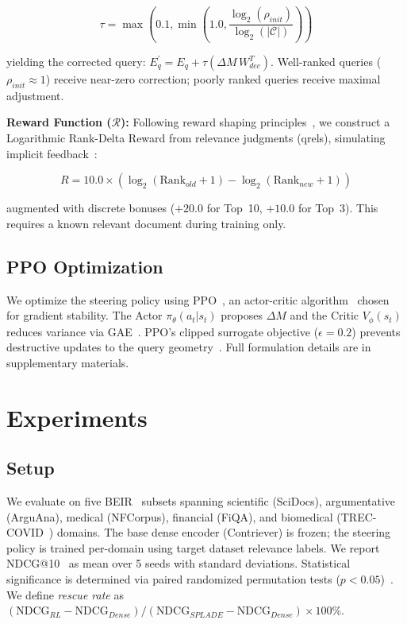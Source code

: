 \documentclass[sigconf]{acmart}
\begin{document}
\begin{equation}
\tau = \max\!\left(0.1, \min\!\left(1.0, \frac{\log_2(\rho_{init})}{\log_2(|\mathcal{C}|)}\right)\right)
\end{equation}

yielding the corrected query: $E_q^{\prime} = E_q + \tau (\Delta M \, W_{dec}^T)$. Well-ranked queries ($\rho_{init} \approx 1$) receive near-zero correction; poorly ranked queries receive maximal adjustment.

\textbf{Reward Function ($\mathcal{R}$):} Following reward shaping principles~\cite{ng1999}, we construct a Logarithmic Rank-Delta Reward from relevance judgments (qrels), simulating implicit feedback~\cite{joachims2002}:

\begin{equation}
R = 10.0 \times (\log_2(\text{Rank}_{old} + 1) - \log_2(\text{Rank}_{new} + 1))
\end{equation}

augmented with discrete bonuses ($+20.0$ for Top~10, $+10.0$ for Top~3). This requires a known relevant document during training only.

\subsection{PPO Optimization}

We optimize the steering policy using PPO~\cite{schulman2017}, an actor-critic algorithm~\cite{konda1999} chosen for gradient stability. The Actor $\pi_\theta(a_t|s_t)$ proposes $\Delta M$ and the Critic $V_\phi(s_t)$ reduces variance via GAE~\cite{schulman2016}. PPO's clipped surrogate objective ($\epsilon = 0.2$) prevents destructive updates to the query geometry~\cite{engstrom2020}. Full formulation details are in supplementary materials.

\section{Experiments}

\subsection{Setup}

We evaluate on five BEIR~\cite{thakur2021} subsets spanning scientific (SciDocs), argumentative (ArguAna), medical (NFCorpus), financial (FiQA), and biomedical (TREC-COVID~\cite{voorhees2021}) domains. The base dense encoder (Contriever) is frozen; the steering policy is trained per-domain using target dataset relevance labels. We report NDCG@10~\cite{jarvelin2002} as mean over 5 seeds with standard deviations. Statistical significance is determined via paired randomized permutation tests ($p < 0.05$)~\cite{smucker2007}. We define \textit{rescue rate} as $(\text{NDCG}_{RL} - \text{NDCG}_{Dense}) / (\text{NDCG}_{SPLADE} - \text{NDCG}_{Dense}) \times 100\%$.
\end{document}
